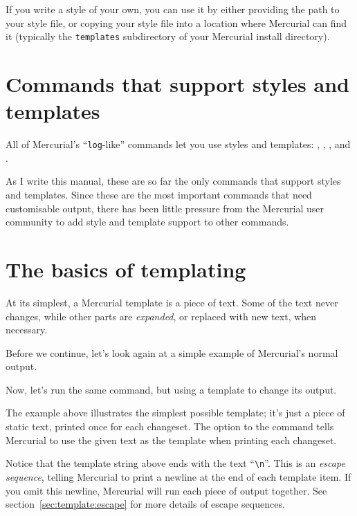 If you write a style of your own, you can use it by either providing
the path to your style file, or copying your style file into a
location where Mercurial can find it (typically the \texttt{templates}
subdirectory of your Mercurial install directory).

\section{Commands that support styles and templates}

All of Mercurial's ``\texttt{log}-like'' commands let you use styles
and templates: , , , and
.

As I write this manual, these are so far the only commands that
support styles and templates.  Since these are the most important
commands that need customisable output, there has been little pressure
from the Mercurial user community to add style and template support to
other commands.

\section{The basics of templating}

At its simplest, a Mercurial template is a piece of text.  Some of the
text never changes, while other parts are \emph{expanded}, or replaced
with new text, when necessary.

Before we continue, let's look again at a simple example of
Mercurial's normal output.


Now, let's run the same command, but using a template to change its
output.


The example above illustrates the simplest possible template; it's
just a piece of static text, printed once for each changeset.  The
 option to the  command tells
Mercurial to use the given text as the template when printing each
changeset.

Notice that the template string above ends with the text
``\Verb+\n+''.  This is an \emph{escape sequence}, telling Mercurial
to print a newline at the end of each template item.  If you omit this
newline, Mercurial will run each piece of output together.  See
section~\ref{sec:template:escape} for more details of escape sequences.

